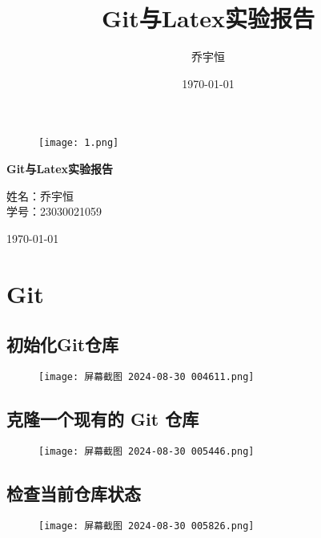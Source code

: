 \documentclass[a4paper, 12pt]{article}
\title{Git与Latex实验报告}
\author{乔宇恒}
\date{\today}
\begin{document}
\begin{titlepage}
    \centering
    \begin{figure}
        \centering
        \texttt{[image: 1.png]}
    \end{figure}
    \vspace*{1in} %
    
    \Huge
    \textbf{Git与Latex实验报告} %
    
    \vspace{1in} %
    
    \Large
    \songti 
    姓名：乔宇恒
    \\学号：23030021059
    
    \vspace{1in} %
    
    \Large
    \today 
    
    \vfill %

    \thispagestyle{empty} %
\end{titlepage}

\tableofcontents
\newpage

\section{Git}
\subsection{初始化Git仓库}
\begin{figure}[h!]
    \centering
    \texttt{[image: 屏幕截图 2024-08-30 004611.png]}
\end{figure}

\subsection{克隆一个现有的 Git 仓库}
\begin{figure}[h!]
    \centering
    \texttt{[image: 屏幕截图 2024-08-30 005446.png]}
\end{figure}

\subsection{检查当前仓库状态}
\begin{figure}[h!]
    \centering
    \texttt{[image: 屏幕截图 2024-08-30 005826.png]}
\end{figure}
\end{document}
